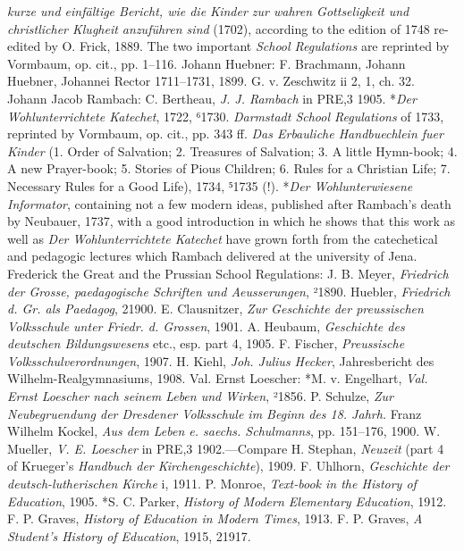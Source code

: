 \emph{kurze und einfältige Bericht, wie die Kinder zur wahren Gottseligkeit und christlicher Klugheit anzuführen sind} (1702), according to the edition of 1748 re-edited by O. Frick, 1889. The two important \emph{School Regulations} are reprinted by Vormbaum, op. cit., pp. 1–116. Johann Huebner: F. Brachmann, Johann Huebner, Johannei Rector 1711–1731, 1899. G. v. Zeschwitz ii 2, 1, ch. 32. Johann Jacob Rambach: C. Bertheau, \emph{J. J. Rambach} in PRE,3 1905. *\emph{Der Wohlunterrichtete Katechet}, 1722, ⁶1730. \emph{Darmstadt School Regulations} of 1733, reprinted by Vormbaum, op. cit., pp. 343 ff. \emph{Das Erbauliche Handbuechlein fuer Kinder} (1. Order of Salvation; 2. Treasures of Salvation; 3. A little Hymn-book; 4. A new Prayer-book; 5. Stories of Pious Children; 6. Rules for a Christian Life; 7. Necessary Rules for a Good Life), 1734, ⁵1735 (!). *\emph{Der Wohlunterwiesene Informator}, containing not a few modern ideas, published after Rambach’s death by Neubauer, 1737, with a good introduction in which he shows that this work as well as \emph{Der Wohlunterrichtete Katechet} have grown forth from the catechetical and pedagogic lectures which Rambach delivered at the university of Jena. Frederick the Great and the Prussian School Regulations: J. B. Meyer, \emph{Friedrich der Grosse, paedagogische Schriften und Aeusserungen}, ²1890. Huebler, \emph{Friedrich d. Gr. als Paedagog}, 21900. E. Clausnitzer, \emph{Zur Geschichte der preussischen Volksschule unter Friedr. d. Grossen}, 1901. A. Heubaum, \emph{Geschichte des deutschen Bildungswesens} etc., esp. part 4, 1905. F. Fischer, \emph{Preussische Volksschulverordnungen}, 1907. H. Kiehl, \emph{Joh. Julius Hecker}, Jahresbericht des Wilhelm-Realgymnasiums, 1908. Val. Ernst Loescher: *M. v. Engelhart, \emph{Val. Ernst Loescher nach seinem Leben und Wirken}, ²1856. P. Schulze, \emph{Zur Neubegruendung der Dresdener Volksschule im Beginn des 18. Jahrh.} Franz Wilhelm Kockel, \emph{Aus dem Leben e. saechs. Schulmanns}, pp. 151–176, 1900. W. Mueller, \emph{V. E. Loescher} in PRE,3 1902.—Compare H. Stephan, \emph{Neuzeit} (part 4 of Krueger’s \emph{Handbuch der Kirchengeschichte}), 1909. F. Uhlhorn, \emph{Geschichte der deutsch-lutherischen Kirche} i, 1911. P. Monroe, \emph{Text-book in the History of Education}, 1905. *S. C. Parker, \emph{History of Modern Elementary Education}, 1912. F. P. Graves, \emph{History of Education in Modern Times}, 1913. F. P. Graves, \emph{A Student’s History of Education}, 1915, 21917.

